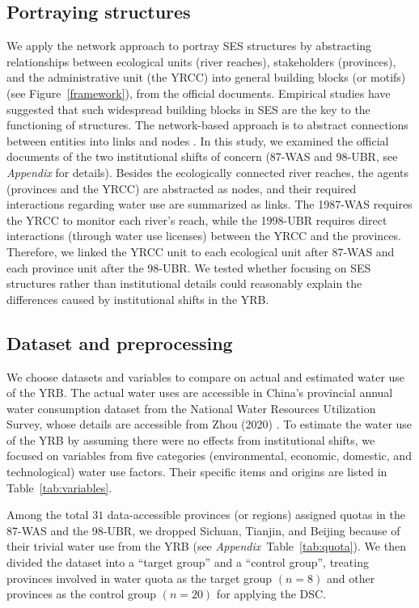 \documentclass[default, sn-standardnature]{sn-jnl}
\begin{document}
\subsection{Portraying structures}\label{sec:structures}
We apply the network \cite{bodin2017b} approach to portray SES structures by abstracting relationships between ecological units (river reaches), stakeholders (provinces), and the administrative unit (the YRCC) into general building blocks (or motifs) (see Figure~\ref{framework}), from the official documents.
Empirical studies have suggested that such widespread building blocks in SES are the key to the functioning of structures. The network-based approach is to abstract connections between entities into links and nodes \cite{bodin2017a,kluger2020,guerrero2015}.
In this study, we examined the official documents of the two institutional shifts of concern (87-WAS and 98-UBR, see \textit{Appendix } for details).
Besides the ecologically connected river reaches, the agents (provinces and the YRCC) are abstracted as nodes, and their required interactions regarding water use are summarized as links.
The 1987-WAS requires the YRCC to monitor each river's reach, while the 1998-UBR requires direct interactions (through water use licenses) between the YRCC and the provinces.
Therefore, we linked the YRCC unit to each ecological unit after 87-WAS and each province unit after the 98-UBR.
We tested whether focusing on SES structures rather than institutional details could reasonably explain the differences caused by institutional shifts in the YRB.

\subsection{Dataset and preprocessing}\label{sec:dataset}
We choose datasets and variables to compare on actual and estimated water use of the YRB.
The actual water uses are accessible in China’s provincial annual water consumption dataset from the National Water Resources Utilization Survey, whose details are accessible from Zhou (2020) \cite{zhou2020}.
To estimate the water use of the YRB by assuming there were no effects from institutional shifts, we focused on variables from five categories (environmental, economic, domestic, and technological) water use factors. Their specific items and origins are listed in Table~\ref{tab:variables}.

Among the total $31$ data-accessible provinces (or regions) assigned quotas in the 87-WAS and the 98-UBR, we dropped Sichuan, Tianjin, and Beijing because of their trivial water use from the YRB (see \textit{Appendix}~Table~\ref{tab:quota}). We then divided the dataset into a ``target group'' and a ``control group'', treating provinces involved in water quota as the target group $(n=8)$ and other provinces as the control group $(n=20)$ for applying the DSC.
\end{document}
